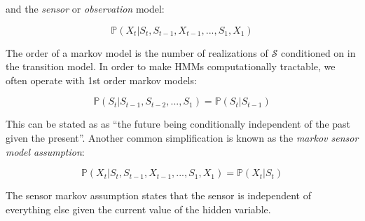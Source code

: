 \documentclass[11pt, oneside, a4paper]{report}
\begin{document}
and the \emph{sensor} or \emph{observation} model:

\begin{equation}
\mathbb{P}(X_t|S_t, S_{t-1}, X_{t-1}, ...,
S_1, X_1)
\end{equation}


 The order of a markov model is the number of realizations
of $\mathcal{S}$ conditioned on in the transition model. In order to
make HMMs computationally tractable, we often operate with 1st order
markov models:

\begin{equation}\label{1st_order_markov}
  \mathbb{P}(S_t|S_{t-1}, S_{t-2},...,S_1)  =  \mathbb{P}(S_t|S_{t-1})
\end{equation}

This can be stated as as ``the future being conditionally independent of
the past given the present''. Another common simplification is known as the \emph{markov sensor model assumption}:


\begin{equation}
  \mathbb{P}(X_t|S_t, S_{t-1}, X_{t-1}, ...,
  S_1, X_1) = \mathbb{P}(X_t|S_t)  
\end{equation}

The sensor markov assumption states that the sensor is independent of
everything else given the current value of the hidden variable.

\begin{thebibliography}{9}


  
\end{thebibliography}
\end{document}

